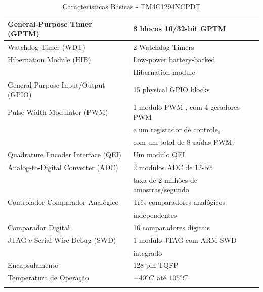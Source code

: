 \begin{longtable}{|l|l|}
	\hline
	General-Purpose Timer (GPTM) & 8 blocos 16/32-bit GPTM \\
	\hline
	Watchdog Timer (WDT) & 2 Watchdog Timers \\
	\hline
	Hibernation Module (HIB) & Low-power battery-backed \\
	 & Hibernation module \\
	\hline
	General-Purpose Input/Output (GPIO) & 15 physical GPIO blocks \\
	\hline
	Pulse Width Modulator (PWM) & 1 modulo PWM , com 4 geradores PWM  \\
	 & e um  registador de controle,\\
	 &  com um total de 8  saídas PWM.\\
	\hline
	Quadrature Encoder Interface (QEI) & Um modulo QEI \\
	\hline
	Analog-to-Digital Converter (ADC) & 2 modulos ADC de 12-bit\\
	 & taxa de 2 milhões de amostras/segundo\\
	\hline
	Controlador Comparador Analógico & Três comparadores analógicos \\
	& independentes \\
	\hline
	Comparador Digital & 16 comparadores digitais \\
	\hline
	JTAG e Serial Wire Debug (SWD) & 1 modulo JTAG  com ARM SWD\\
	& integrado \\
	\hline
	Encapsulamento & 128-pin TQFP \\
	\hline
	Temperatura de Operação & $-40 \degree C$ até $105 \degree C$ \\
	\hline
	\caption{Características Básicas - TM4C1294NCPDT \cite{DATASHEET_TIVA}}
	\label{tab:CaracteristicasMicroTiva}
\end{longtable}





